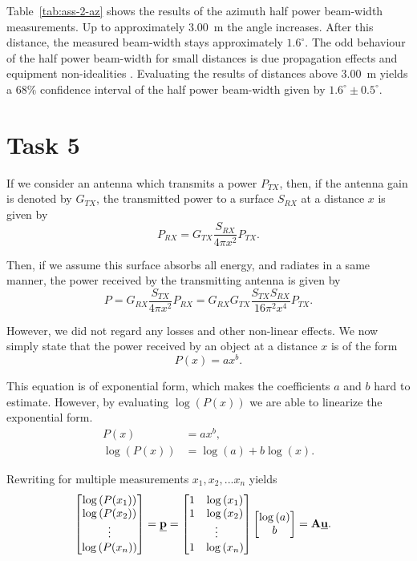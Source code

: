 \documentclass[11pt,titlepage]{report}
\begin{document}
Table~\ref{tab:ass-2-az} shows the results of the azimuth half power beam-width measurements. Up to approximately \SI{3.00}{m} the angle increases. After this distance, the measured beam-width stays approximately $1.6^\circ$. The odd behaviour of the half power beam-width for small distances is due propagation effects and equipment non-idealities \cite{epo4-manual}. Evaluating the results of distances above \SI{3.00}{m} yields a $68\%$ confidence interval of the half power beam-width given by $1.6^{\circ} \pm 0.5^{\circ}$.

\section{Task 5}
If we consider an antenna which transmits a power $P_{TX}$, then, if the antenna gain is denoted by $G_{TX}$, the transmitted power to a surface $S_{RX}$ at a distance $x$ is given by	
\begin{equation}
 	P_{RX} = G_{TX} \frac{S_{RX}}{4 \pi x^2}P_{TX}.
\end{equation}

Then, if we assume this surface absorbs all energy, and radiates in a same manner, the power received by the transmitting antenna is given by
\begin{equation}
	P = G_{RX} \frac{S_{TX}}{4 \pi x^2}P_{RX} = G_{RX} G_{TX} \frac{S_{TX} S_{RX}}{16 \pi^2 x^4} P_{TX}.
\end{equation}

However, we did not regard any losses and other non-linear effects. We now simply state that the power received by an object at a distance $x$ is of the form
\begin{equation}
	P(x) = a x^b.
\end{equation}

This equation is of exponential form, which makes the coefficients $a$ and $b$ hard to estimate. However, by evaluating $\log{(P(x))}$ we are able to linearize the exponential form.
\begin{align}
	P(x)&=a x^b, \\
	\log{(P(x))} &= \log{(a)} + b \log{(x)}.
\end{align}

Rewriting for multiple measurements $x_1, x_2, ... x_n$ yields
\begin{align}
	\begin{bmatrix}
		\log{(P(x_1))} \\
		\log{(P(x_2))} \\
		\vdots \\
		\log{(P(x_n))}
	\end{bmatrix} &= \vec{p} = \begin{bmatrix}
		1 & \log{(x_1)} \\
		1 & \log{(x_2)} \\
		\multicolumn{2}{c}{\vdots} \\
		1 & \log{(x_n)}
	\end{bmatrix} \begin{bmatrix}
		\log{(a)} \\
		b
	\end{bmatrix} = \mat{A} \vec{u}.
\end{align}
\end{document}
